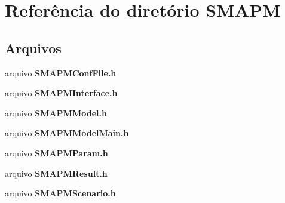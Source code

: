 \section{Referência do diretório S\+M\+A\+PM}
\label{dir_44d92f88aba858756560b43eabd78667}
\subsection*{Arquivos}
\begin{DoxyCompactItemize}
\item 
arquivo {\bf S\+M\+A\+P\+M\+Conf\+File.\+h}
\item 
arquivo {\bf S\+M\+A\+P\+M\+Interface.\+h}
\item 
arquivo {\bf S\+M\+A\+P\+M\+Model.\+h}
\item 
arquivo {\bf S\+M\+A\+P\+M\+Model\+Main.\+h}
\item 
arquivo {\bf S\+M\+A\+P\+M\+Param.\+h}
\item 
arquivo {\bf S\+M\+A\+P\+M\+Result.\+h}
\item 
arquivo {\bf S\+M\+A\+P\+M\+Scenario.\+h}
\end{DoxyCompactItemize}
